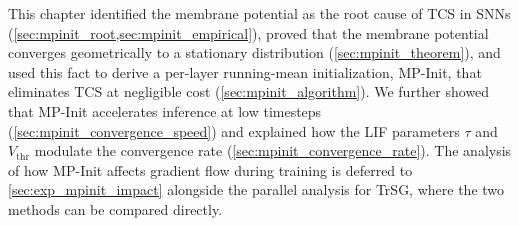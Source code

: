 This chapter identified the membrane potential as the root cause of TCS in SNNs (\cref{sec:mpinit_root,sec:mpinit_empirical}), proved that the membrane potential converges geometrically to a stationary distribution (\cref{sec:mpinit_theorem}), and used this fact to derive a per-layer running-mean initialization, MP-Init, that eliminates TCS at negligible cost (\cref{sec:mpinit_algorithm}). We further showed that MP-Init accelerates inference at low timesteps (\cref{sec:mpinit_convergence_speed}) and explained how the LIF parameters $\tau$ and $V_{\text{thr}}$ modulate the convergence rate (\cref{sec:mpinit_convergence_rate}). The analysis of how MP-Init affects gradient flow during training is deferred to \cref{sec:exp_mpinit_impact} alongside the parallel analysis for TrSG, where the two methods can be compared directly.
